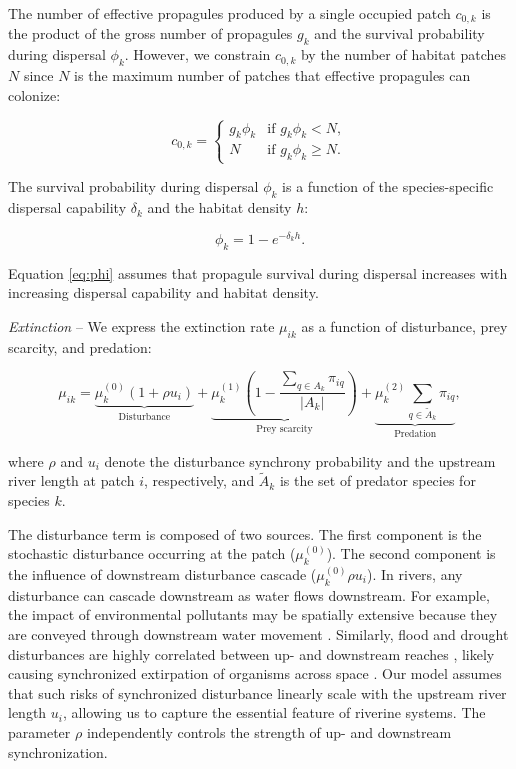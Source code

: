 \documentclass[11pt, class=article, crop=false]{standalone}
\theoremstyle{definition}
\begin{document}
The number of effective propagules produced by a single occupied patch $c_{0, k}$ is the product of the gross number of propagules $g_{k}$ and the survival probability during dispersal $\phi_k$.
However, we constrain $c_{0, k}$ by the number of habitat patches $N$ since $N$ is the maximum number of patches that effective propagules can colonize:

\begin{equation}
    c_{0, k} = 
    \begin{cases}
        g_k \phi_k & \text{if $g_k \phi_k < N$},\\
        N & \text{if $g_k \phi_k \ge N$}.
    \end{cases}
    \label{eq:c0-prod}
\end{equation}

The survival probability during dispersal $\phi_k$ is a function of the species-specific dispersal capability $\delta_k$ and the habitat density $h$:

\begin{equation}
    \phi_k = 1 - e^{-\delta_k h}.
    \label{eq:phi}
\end{equation}

Equation \ref{eq:phi} assumes that propagule survival during dispersal increases with increasing dispersal capability and habitat density.

\textit{Extinction} -- 
We express the extinction rate $\mu_{ik}$ as a function of disturbance, prey scarcity, and predation:

\begin{equation}
    \mu_{ik} = 
        \underbrace{\mu_{k}^{(0)} (1 + \rho u_i)}_{\text{Disturbance}} + 
        \underbrace{\mu_{k}^{(1)} \left(1 - \frac{\sum_{q \in A_k} \pi_{iq}}{|A_k|} \right)}_{\text{Prey scarcity}} + 
        \underbrace{\mu_{k}^{(2)} \sum_{q \in \tilde{A}_k} \pi_{iq}}_{\text{Predation}},
    \label{eq:extn}
\end{equation}

where $\rho$ and $u_i$ denote the disturbance synchrony probability and the upstream river length at patch $i$, respectively, and $\tilde{A}_k$ is the set of predator species for species $k$.

The disturbance term is composed of two sources.
The first component is the stochastic disturbance occurring at the patch ($\mu_{k}^{(0)}$).
The second component is the influence of downstream disturbance cascade ($\mu_{k}^{(0)} \rho u_i$).
In rivers, any disturbance can cascade downstream as water flows downstream.
For example, the impact of environmental pollutants may be spatially extensive because they are conveyed through downstream water movement \citep{massoudieh_biogeochemical_2010}.
Similarly, flood and drought disturbances are highly correlated between up- and downstream reaches \citep{swanson_flood_1998, nakamura_disturbance_2000, sarremejane_drought_2021}, likely causing synchronized extirpation of organisms across space \citep{larsen_geography_2021}.
Our model assumes that such risks of synchronized disturbance linearly scale with the upstream river length $u_i$, allowing us to capture the essential feature of riverine systems.
The parameter $\rho$ independently controls the strength of up- and downstream synchronization.
\end{document}
